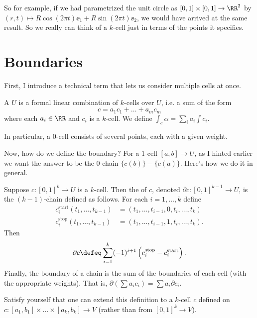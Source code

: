 \documentclass[11pt]{scrreprt}
\begin{document}
So for example, if we had parametrized the unit circle as $[0,1] \times [0,1] \to \RR^2$
by $(r,t) \mapsto R\cos(2\pi t) \ee_1 + R\sin(2\pi t) \ee_2$, we would have arrived at the same result.
So we really can think of a $k$-cell just in terms of the points it specifies.

\section{Boundaries}
First, I introduce a technical term that lets us consider multiple cells at once.
\begin{definition}
	A  $U$ is a formal linear combination of $k$-cells over $U$,
	i.e. a sum of the form
	\[ c = a_1 c_1 + \dots + a_m c_m \]
	where each $a_i \in \RR$ and $c_i$ is a $k$-cell.
	We define $\int_c \alpha = \sum_i a_i \int c_i$.
\end{definition}
In particular, a $0$-cell consists of several points, each with a given weight.

Now, how do we define the boundary?
For a $1$-cell $[a,b] \to U$, as I hinted earlier we want the answer to be the $0$-chain $\{c(b)\}-\{c(a)\}$.
Here's how we do it in general.
\begin{definition}
	Suppose $c : [0,1]^k \to U$ is a $k$-cell.
	Then the  of $c$, denoted $\partial c : [0,1]^{k-1} \to U$,
	is the $(k-1)$-chain defined as follows.
	For each $i = 1,\dots,k$ define
	\begin{align*}
		c_i^{\text{start}}(t_1, \dots, t_{k-1}) &
		= (t_1, \dots, t_{i-1}, 0, t_i, \dots, t_k) \\
		c_i^{\text{stop}}(t_1, \dots, t_{k-1}) &
		= (t_1, \dots, t_{i-1}, 1, t_i, \dots, t_k).
	\end{align*}
	Then
	\[ \partial c \defeq
	\sum_{i=1}^k (-1)^{i+1} \left( c_i^{\text{stop}} - c_i^{\text{start}}  \right). \]
	Finally, the boundary of a chain is the sum of the boundaries of each cell (with the appropriate weights).
	That is, $\partial(\sum a_ic_i) = \sum a_i \partial c_i$.
\end{definition}
\begin{ques}
	Satisfy yourself that one can extend this definition to
	a $k$-cell $c$ defined on $c : [a_1, b_1] \times \dots \times [a_k, b_k] \to V$
	(rather than from $[0,1]^k \to V$).
\end{ques}
\end{document}
